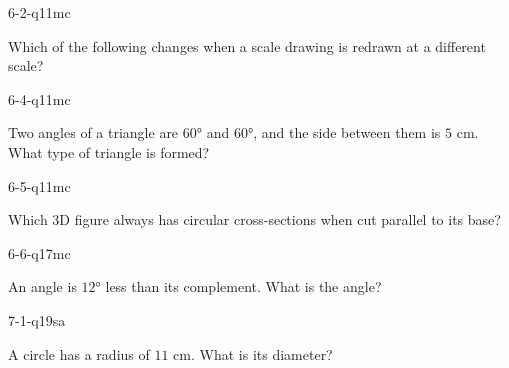 \begin{practiceQuestion}{6-2-q11}{mc}
\begin{questionText}
Which of the following changes when a scale drawing is redrawn at a different scale?
\end{questionText}
\end{practiceQuestion}

\begin{practiceQuestion}{6-4-q11}{mc}
\begin{questionText}
Two angles of a triangle are $60°$ and $60°$, and the side between them is $5$ cm. What type of triangle is formed?
\end{questionText}
\end{practiceQuestion}

\begin{practiceQuestion}{6-5-q11}{mc}
\begin{questionText}
Which 3D figure always has circular cross-sections when cut parallel to its base?
\end{questionText}
\end{practiceQuestion}

\begin{practiceQuestion}{6-6-q17}{mc}
\begin{questionText}
An angle is $12°$ less than its complement. What is the angle?
\end{questionText}
\end{practiceQuestion}

\begin{practiceQuestion}{7-1-q19}{sa}
\begin{questionText}
A circle has a radius of $11$ cm. What is its diameter?
\end{questionText}
\end{practiceQuestion}

